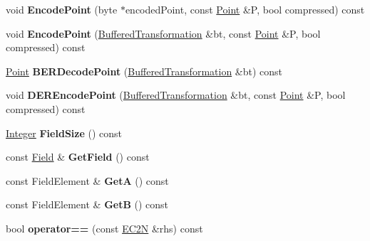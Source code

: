 \begin{DoxyCompactItemize}
\item 
\hypertarget{class_e_c2_n_aeae4368863718ea9d0ee2d128d37c05f}{
void {\bfseries EncodePoint} (byte $\ast$encodedPoint, const \hyperlink{struct_e_c2_n_point}{Point} \&P, bool compressed) const }
\label{class_e_c2_n_aeae4368863718ea9d0ee2d128d37c05f}

\item 
\hypertarget{class_e_c2_n_a887bb90533cc8cb8728ee14d3b79a4b9}{
void {\bfseries EncodePoint} (\hyperlink{class_buffered_transformation}{BufferedTransformation} \&bt, const \hyperlink{struct_e_c2_n_point}{Point} \&P, bool compressed) const }
\label{class_e_c2_n_a887bb90533cc8cb8728ee14d3b79a4b9}

\item 
\hypertarget{class_e_c2_n_aa07255396b7216920026266daed5f047}{
\hyperlink{struct_e_c2_n_point}{Point} {\bfseries BERDecodePoint} (\hyperlink{class_buffered_transformation}{BufferedTransformation} \&bt) const }
\label{class_e_c2_n_aa07255396b7216920026266daed5f047}

\item 
\hypertarget{class_e_c2_n_a0addec434825f66430a61952d82b928a}{
void {\bfseries DEREncodePoint} (\hyperlink{class_buffered_transformation}{BufferedTransformation} \&bt, const \hyperlink{struct_e_c2_n_point}{Point} \&P, bool compressed) const }
\label{class_e_c2_n_a0addec434825f66430a61952d82b928a}

\item 
\hypertarget{class_e_c2_n_a397b3e883800018cb6e0b4242c2d2800}{
\hyperlink{class_integer}{Integer} {\bfseries FieldSize} () const }
\label{class_e_c2_n_a397b3e883800018cb6e0b4242c2d2800}

\item 
\hypertarget{class_e_c2_n_ac46188ed336adf52856d00b0a02a8390}{
const \hyperlink{class_g_f2_n_p}{Field} \& {\bfseries GetField} () const }
\label{class_e_c2_n_ac46188ed336adf52856d00b0a02a8390}

\item 
\hypertarget{class_e_c2_n_a7e9bf807b897c85796c401b6aab8da4f}{
const FieldElement \& {\bfseries GetA} () const }
\label{class_e_c2_n_a7e9bf807b897c85796c401b6aab8da4f}

\item 
\hypertarget{class_e_c2_n_a2e2c7196123b56112280254ffb310d29}{
const FieldElement \& {\bfseries GetB} () const }
\label{class_e_c2_n_a2e2c7196123b56112280254ffb310d29}

\item 
\hypertarget{class_e_c2_n_a069506321f5f7949d0613ad48d1454f6}{
bool {\bfseries operator==} (const \hyperlink{class_e_c2_n}{EC2N} \&rhs) const }
\label{class_e_c2_n_a069506321f5f7949d0613ad48d1454f6}

\end{DoxyCompactItemize}


